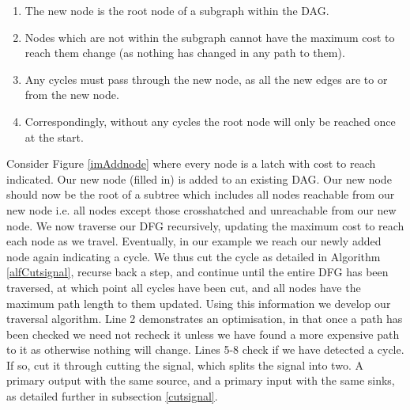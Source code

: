 \documentclass[12pt,final,oneside]{dwThesis} %
\begin{document}
   \begin{enumerate}

      \item The new node is the root node of a subgraph within the \gls{DAG}.
      \item Nodes which are not within the subgraph cannot have the maximum
         cost to reach them change (as nothing has changed in any path to
         them).
      \item Any cycles must pass through the new node, as all the new edges are
         to or from the new node.
      \item Correspondingly, without any cycles the root node will only be
         reached once at the start.  
   \end{enumerate}
   Consider Figure
   \ref{imAddnode} where every node is a latch with cost to reach indicated.
   Our new node (filled in) is added to an existing \gls{DAG}. Our new node
   should now be the root of a subtree which includes all nodes reachable
   from our new node i.e. all nodes except those crosshatched and
   unreachable from our new node.  We now traverse our \gls{DFG}
   recursively, updating the maximum cost to reach each node as we travel.
   Eventually, in our example we reach our newly added node again indicating
   a cycle. We thus cut the cycle as detailed in Algorithm
   \ref{alfCutsignal}, recurse back a step,
   and continue until the entire \gls{DFG} has been traversed, at which
   point all cycles have been cut, and all nodes have the maximum path
   length to them updated.  Using this information we develop our traversal
   algorithm.  Line 2 demonstrates an optimisation, in that once a path has
   been checked we need not recheck it unless we have found a more expensive
   path to it as otherwise nothing will change.  Lines 5-8 check if we have
   detected a cycle. If so, cut it through cutting the signal, which splits
   the signal into two. A primary output with the same source, and a primary
   input with the same sinks, as detailed further in subsection
   \ref{cutsignal}.
\end{document}
